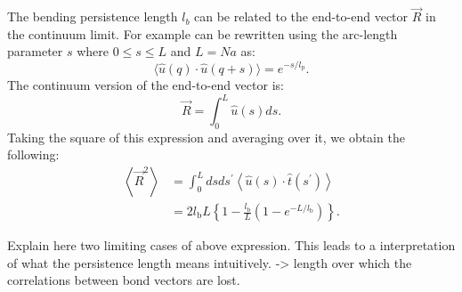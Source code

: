 The bending persistence length $l_b$ can be related to the end-to-end vector $\vec{R}$ in
the continuum limit. For example can be rewritten using the arc-length parameter $s$
where $0 \leq s \leq L$ and $L = Na$ as:
\begin{equation}
    \label{hoi}
    \langle\widehat{u}(q) \cdot \widehat{u}(q+s)\rangle= e^{-s / l_{\mathrm{p}}}.
\end{equation}
The continuum version of the end-to-end vector is:
\begin{equation}
    \vec{R}=\int_{0}^{L} \widehat{u}(s) d s.
\end{equation}
Taking the square of this expression and averaging over it, we obtain the following:
\begin{equation}
\begin{aligned}
    \left\langle\vec{R}^{2}\right\rangle
    &= \int_{0}^{L} d s d s^{\prime}\left\langle\widehat{u}(s) \cdot
  \widehat{t}\left(s^{\prime}\right)\right\rangle \\
    &= 2 l_{\mathrm{b}} L\left\{1-\frac{l_{\mathrm{b}}}{L}\left(1-e^{-L /
l_{\mathrm{b}}}\right)\right\}.
\end{aligned}
\end{equation}

Explain here two limiting cases of above expression. This leads to a interpretation of
what the persistence length means intuitively. -> length over which the correlations
between bond vectors are lost.
